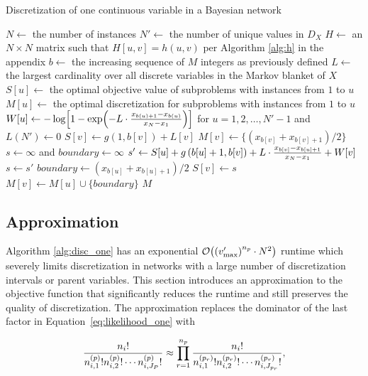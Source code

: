 \begin{algorithm}
\caption{Discretization of one continuous variable in a Bayesian network}
\label{alg:disc_one}
\begin{algorithmic}[5]
\State
\State $N \leftarrow$ the number of instances
\State $N' \leftarrow$ the number of unique values in $D_X$
\State $H \leftarrow$ an $N \times N$ matrix such that $H[u,v] = h(u,v)$ per Algorithm \ref{alg:h} in the appendix
\State $b \leftarrow$ the increasing sequence of $M$ integers as previously defined
\State $L \leftarrow$ the largest cardinality over all discrete variables in the Markov blanket of $X$
\State $S[u] \leftarrow$ the optimal objective value of subproblems with instances from $1$ to $u$
\State $M[u] \leftarrow$ the optimal discretization for subproblems with instances from $1$ to $u$
\State $W[u]  \leftarrow - \log\brock{1 - {\exp\paren{- L \cdot{ {{x_{b(u)+1} - x_{b(u)}}\over{x_N - x_1}}}}}}$ for $u = 1,2, \ldots,N'-1$ and $L(N') \leftarrow 0$
\State
{}
\State $S[v] \leftarrow g \left(1,b[v] \right) + L[v]$
\State $M[v] \leftarrow \{ ({x_{b[v]} + x_{b[v]+1}}) / 2\}$
\Else
\State $s \leftarrow \infty$ and $boundary \leftarrow \infty$
\State $s' \leftarrow S[u] + g \left( b[u]+1,b[v] \right) +  {L \cdot {{x_{b[v]} - x_{b[u] + 1}}\over{x_N - x_1}}} + W[v]$
\State $s \leftarrow s'$
\State $boundary \leftarrow ({x_{b[u]} + x_{b[u]+1}}) / 2$
\EndIf
\EndFor
\State $S[v] \leftarrow s$
\State $M[v] \leftarrow M[u] \cup \{ boundary\}$
\EndIf
\EndFor
 \State \Return $M$
\EndFunction
\end{algorithmic}
\end{algorithm}


\subsection{Approximation}

Algorithm \ref{alg:disc_one} has an exponential $\bigo\paren{\paren{v'_\text{max}}^{n_p} \cdot N^2}$ runtime which severely limits discretization in networks with a large number of discretization intervals or parent variables.
This section introduces an approximation to the objective function that significantly reduces the runtime and still preserves the quality of discretization.
The approximation replaces the dominator of the last factor in Equation~\ref{eq:likelihood_one} with

\begin{equation}
{\frac{{n_i}!}{ {n^{(p)}_{i,1} !} {n^{(p)}_{i,2} !} \cdots {n^{(p)}_{i,J_P} !}}} \approx \prod_{r=1}^{n_p} { {{{n}_i}!}\over{ {n^{(p_r)}_{i,1} !} {n^{(p_r)}_{i,2} !} \cdots {n^{(p_r)}_{i,J_{p_r}} !}}}\text{,}
\end{equation}

